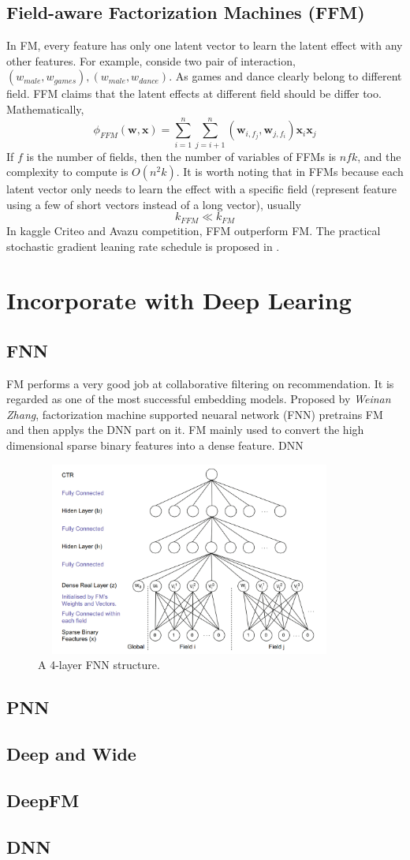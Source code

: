 \documentclass{article}
\begin{document}
\subsection{Field-aware Factorization Machines (FFM)}
In FM, every feature has only one latent vector to learn the latent effect with any other features. For example, conside two pair of interaction, $(w_{male},w_{games}), (w_{male},w_{dance})$. As games and dance clearly belong to different field. FFM \cite{DBLP:conf/recsys/JuanZCL16}
claims that the latent effects at different field should be differ too.
Mathematically,
$$\phi_{FFM}(\textbf{w},\textbf{x})=\sum_{i=1}^{n} \sum_{j=i+1}^{n}(\textbf{w}_{i,f_{j}},\textbf{w}_{j,f_{i}})\textbf{x}_{i} \textbf{x}_{j}$$
If $f$ is the number of fields, then the number of variables of
FFMs is $nfk$, and the complexity to compute is $O(n^{2}k)$. It is worth noting that in FFMs because each latent vector only needs to learn the effect with a specific field (represent feature using a few of short vectors instead of a long vector), usually
$$k_{FFM} \ll k_{FM}$$
In kaggle Criteo and Avazu competition, FFM outperform FM. The practical stochastic gradient leaning rate schedule is proposed in \cite{DBLP:conf/pakdd/ChinZJL15}. 


\section{Incorporate with Deep Learing}
\subsection{FNN}
FM performs a very good job at collaborative filtering on recommendation. It is regarded as one of the most successful embedding models.
Proposed by  \textsl{Weinan Zhang}, factorization machine supported neuaral network (FNN) pretrains FM  and then applys the DNN part on it. FM mainly used to convert the high dimensional sparse binary features into a dense feature. DNN 
\begin{figure}[h]
\centering
\includegraphics[width=4in,height=2.5in]{fnn}
\caption{A 4-layer FNN structure.}
\end{figure}
\subsection{PNN}
\subsection{Deep and Wide}
\subsection{DeepFM}
\subsection{DNN}



\end{document}
